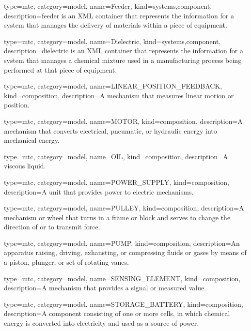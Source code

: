 {
  type=mtc,
  category=model,
  name={Feeder},
  kind={systems,component},
  description={\gls{feeder} is an XML container that represents the information for a system that manages the delivery of materials within a piece of equipment. }
}


{
  type=mtc,
  category=model,
  name={Dielectric},
  kind={systems,component},
  description={\gls{dielectric} is an XML container that represents the information for a system that manages a chemical mixture used in a manufacturing process being performed at that piece of equipment.}
}


{
  type=mtc,
  category=model,
  name={LINEAR\_POSITION\_FEEDBACK},
  kind={composition},
  description={A mechanism that measures linear motion or position.}
}


{
  type=mtc,
  category=model,
  name={MOTOR},
  kind={composition},
  description={A mechanism that converts electrical, pneumatic, or hydraulic energy into mechanical energy.}
}


{
  type=mtc,
  category=model,
  name={OIL},
  kind={composition},
  description={A viscous liquid.}
}


{
  type=mtc,
  category=model,
  name={POWER\_SUPPLY},
  kind={composition},
  description={A unit that provides power to electric mechanisms.}
}


{
  type=mtc,
  category=model,
  name={PULLEY},
  kind={composition},
  description={A mechanism or wheel that turns in a frame or block and serves to change the direction of or to transmit force.}
}


{
  type=mtc,
  category=model,
  name={PUMP},
  kind={composition},
  description={An apparatus raising, driving, exhausting, or compressing fluids or gases by means of a piston, plunger, or set of rotating vanes.}
}


{
  type=mtc,
  category=model,
  name={SENSING\_ELEMENT},
  kind={composition},
  description={A mechanism that provides a signal or measured value.}
}


{
  type=mtc,
  category=model,
  name={STORAGE\_BATTERY},
  kind={composition},
  description={A component consisting of one or more cells, in which chemical energy is converted into electricity and used as a source of power. }
}


